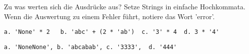 \question[2]
Zu was werten sich die Ausdrücke aus? Setze Strings in einfache Hochkommata.
Wenn die Auswertung zu einem Fehler führt, notiere das
Wort 'error'.

\begin{lstlisting}
a. 'None' * 2   b. 'abc' + (2 * 'ab')  c. '3' * 4  d. 3 * '4'
\end{lstlisting}
\begin{solutionbox}{2cm}
\begin{lstlisting}
a. 'NoneNone', b. 'abcabab', c. '3333',  d. '444'
\end{lstlisting}
\end{solutionbox}
